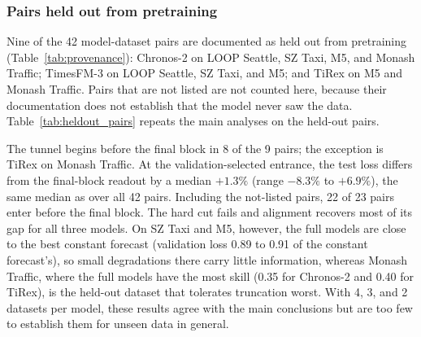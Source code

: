 
\subsubsection{Pairs held out from pretraining}
\label{sec:app_heldout_pairs}

Nine of the 42 model-dataset pairs are documented as held out from pretraining (Table~\ref{tab:provenance}): Chronos-2 on LOOP Seattle, SZ Taxi, M5, and Monash Traffic; TimesFM-3 on LOOP Seattle, SZ Taxi, and M5; and TiRex on M5 and Monash Traffic. Pairs that are not listed are not counted here, because their documentation does not establish that the model never saw the data. Table~\ref{tab:heldout_pairs} repeats the main analyses on the held-out pairs.

The tunnel begins before the final block in 8 of the 9 pairs; the exception is TiRex on Monash Traffic. At the validation-selected entrance, the test loss differs from the final-block readout by a median $+1.3\%$ (range $-8.3\%$ to $+6.9\%$), the same median as over all 42 pairs. Including the not-listed pairs, 22 of 23 pairs enter before the final block. The hard cut fails and alignment recovers most of its gap for all three models. On SZ Taxi and M5, however, the full models are close to the best constant forecast (validation loss 0.89 to 0.91 of the constant forecast's), so small degradations there carry little information, whereas Monash Traffic, where the full models have the most skill (0.35 for Chronos-2 and 0.40 for TiRex), is the held-out dataset that tolerates truncation worst. With 4, 3, and 2 datasets per model, these results agree with the main conclusions but are too few to establish them for unseen data in general.

